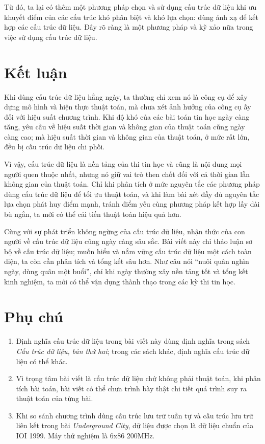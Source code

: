 \documentclass[11pt]{article}
\begin{document}
Từ đó, ta lại có thêm một phương pháp chọn và sử dụng cấu trúc dữ liệu khi ưu
khuyết điểm của các cấu trúc khó phân biệt và khó lựa chọn: dùng ánh xạ để
kết hợp các cấu trúc dữ liệu. Đây rõ ràng là một phương pháp và kỹ xảo nữa
trong việc sử dụng cấu trúc dữ liệu.

\section{Kết luận}

Khi dùng cấu trúc dữ liệu hằng ngày, ta thường chỉ xem nó là công cụ để xây
dựng mô hình và hiện thực thuật toán, mà chưa xét ảnh hưởng của công cụ ấy
đối với hiệu suất chương trình. Khi độ khó của các bài toán tin học ngày càng
tăng, yêu cầu về hiệu suất thời gian và không gian của thuật toán cũng ngày
càng cao; mà hiệu suất thời gian và không gian của thuật toán, ở mức rất lớn,
đều bị cấu trúc dữ liệu chi phối.

Vì vậy, cấu trúc dữ liệu là nền tảng của thi tin học và cũng là nội dung mọi
người quen thuộc nhất, nhưng nó giữ vai trò then chốt đối với cả thời gian
lẫn không gian của thuật toán. Chỉ khi phân tích ở mức nguyên tắc các phương
pháp dùng cấu trúc dữ liệu để tối ưu thuật toán, và khi làm bài xét đầy đủ
nguyên tắc lựa chọn phát huy điểm mạnh, tránh điểm yếu cùng phương pháp kết
hợp lấy dài bù ngắn, ta mới có thể cải tiến thuật toán hiệu quả hơn.

Cùng với sự phát triển không ngừng của cấu trúc dữ liệu, nhận thức của con
người về cấu trúc dữ liệu cũng ngày càng sâu sắc. Bài viết này chỉ thảo luận
sơ bộ về cấu trúc dữ liệu; muốn hiểu và nắm vững cấu trúc dữ liệu một cách
toàn diện, ta còn cần phân tích và tổng kết sâu hơn. Như câu nói ``nuôi quân
nghìn ngày, dùng quân một buổi'', chỉ khi ngày thường xây nền tảng tốt và
tổng kết kinh nghiệm, ta mới có thể vận dụng thành thạo trong các kỳ thi tin
học.

\appendix

\section{Phụ chú}

\begin{enumerate}
  \item Định nghĩa cấu trúc dữ liệu trong bài viết này dùng định nghĩa trong
  sách \textit{Cấu trúc dữ liệu, bản thứ hai}; trong các sách khác, định
  nghĩa cấu trúc dữ liệu có thể khác.
  \item Vì trọng tâm bài viết là cấu trúc dữ liệu chứ không phải thuật toán,
  khi phân tích bài toán, bài viết có thể chưa trình bày thật chi tiết quá
  trình suy ra thuật toán của từng bài.
  \item Khi so sánh chương trình dùng cấu trúc lưu trữ tuần tự và cấu trúc
  lưu trữ liên kết trong bài \textit{Underground City}, dữ liệu được chọn là
  dữ liệu chuẩn của IOI 1999. Máy thử nghiệm là 6x86 200MHz.
\end{enumerate}
\end{document}
